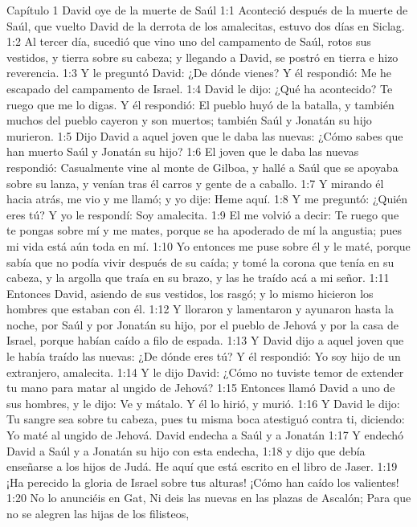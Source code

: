 Capítulo 1
David oye de la muerte de Saúl  
1:1 Aconteció después de la muerte de Saúl, que vuelto David de la derrota de los amalecitas, estuvo dos días en Siclag.  
1:2 Al tercer día, sucedió que vino uno del campamento de Saúl, rotos sus vestidos, y tierra sobre su cabeza; y llegando a David, se postró en tierra e hizo reverencia.  
1:3 Y le preguntó David: ¿De dónde vienes? Y él respondió: Me he escapado del campamento de Israel.  
1:4 David le dijo: ¿Qué ha acontecido? Te ruego que me lo digas. Y él respondió: El pueblo huyó de la batalla, y también muchos del pueblo cayeron y son muertos; también Saúl y Jonatán su hijo murieron.  
1:5 Dijo David a aquel joven que le daba las nuevas: ¿Cómo sabes que han muerto Saúl y Jonatán su hijo?  
1:6 El joven que le daba las nuevas respondió: Casualmente vine al monte de Gilboa, y hallé a Saúl que se apoyaba sobre su lanza, y venían tras él carros y gente de a caballo.  
1:7 Y mirando él hacia atrás, me vio y me llamó; y yo dije: Heme aquí.  
1:8 Y me preguntó: ¿Quién eres tú? Y yo le respondí: Soy amalecita.  
1:9 El me volvió a decir: Te ruego que te pongas sobre mí y me mates, porque se ha apoderado de mí la angustia; pues mi vida está aún toda en mí.  
1:10 Yo entonces me puse sobre él y le maté, porque sabía que no podía vivir después de su caída; y tomé la corona que tenía en su cabeza, y la argolla que traía en su brazo, y las he traído acá a mi señor. 
1:11 Entonces David, asiendo de sus vestidos, los rasgó; y lo mismo hicieron los hombres que estaban con él.  
1:12 Y lloraron y lamentaron y ayunaron hasta la noche, por Saúl y por Jonatán su hijo, por el pueblo de Jehová y por la casa de Israel, porque habían caído a filo de espada.  
1:13 Y David dijo a aquel joven que le había traído las nuevas: ¿De dónde eres tú? Y él respondió: Yo soy hijo de un extranjero, amalecita.  
1:14 Y le dijo David: ¿Cómo no tuviste temor de extender tu mano para matar al ungido de Jehová?  
1:15 Entonces llamó David a uno de sus hombres, y le dijo: Ve y mátalo. Y él lo hirió, y murió.  
1:16 Y David le dijo: Tu sangre sea sobre tu cabeza, pues tu misma boca atestiguó contra ti, diciendo: Yo maté al ungido de Jehová.  
David endecha a Saúl y a Jonatán  
1:17 Y endechó David a Saúl y a Jonatán su hijo con esta endecha,  
1:18 y dijo que debía enseñarse a los hijos de Judá. He aquí que está escrito en el libro de Jaser.  
1:19 ¡Ha perecido la gloria de Israel sobre tus alturas!  
¡Cómo han caído los valientes!  
1:20 No lo anunciéis en Gat,  
Ni deis las nuevas en las plazas de Ascalón;  
Para que no se alegren las hijas de los filisteos,  
